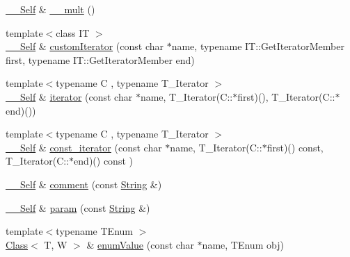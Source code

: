 \begin{DoxyCompactItemize}
\item 
\hyperlink{classSLB_1_1Class_aef6fc94f5e50c96268e669ab6946ad8b}{\+\_\+\+\_\+\+Self} \& \hyperlink{classSLB_1_1Class_a44ac413ee19c8266018ed7bf7909b68b}{\+\_\+\+\_\+mult} ()
\item 
{\footnotesize template$<$class IT $>$ }\\\hyperlink{classSLB_1_1Class_aef6fc94f5e50c96268e669ab6946ad8b}{\+\_\+\+\_\+\+Self} \& \hyperlink{classSLB_1_1Class_ab05f52bee9d746009e35de1e86103c0d}{custom\+Iterator} (const char $\ast$name, typename I\+T\+::\+Get\+Iterator\+Member first, typename I\+T\+::\+Get\+Iterator\+Member end)
\item 
{\footnotesize template$<$typename C , typename T\+\_\+\+Iterator $>$ }\\\hyperlink{classSLB_1_1Class_aef6fc94f5e50c96268e669ab6946ad8b}{\+\_\+\+\_\+\+Self} \& \hyperlink{classSLB_1_1Class_a565d027072f2df91a30b965a43d27ed0}{iterator} (const char $\ast$name, T\+\_\+\+Iterator(C\+::$\ast$first)(), T\+\_\+\+Iterator(C\+::$\ast$end)())
\item 
{\footnotesize template$<$typename C , typename T\+\_\+\+Iterator $>$ }\\\hyperlink{classSLB_1_1Class_aef6fc94f5e50c96268e669ab6946ad8b}{\+\_\+\+\_\+\+Self} \& \hyperlink{classSLB_1_1Class_aa9677ffc2710abb570c70af8929fa027}{const\+\_\+iterator} (const char $\ast$name, T\+\_\+\+Iterator(C\+::$\ast$first)() const, T\+\_\+\+Iterator(C\+::$\ast$end)() const )
\item 
\hyperlink{classSLB_1_1Class_aef6fc94f5e50c96268e669ab6946ad8b}{\+\_\+\+\_\+\+Self} \& \hyperlink{classSLB_1_1Class_a60cedfead3b3fa8af93ee2f607692d9d}{comment} (const \hyperlink{namespaceSLB_a6a4c36e7004d99c0535c2c91c200c9a1}{String} \&)
\item 
\hyperlink{classSLB_1_1Class_aef6fc94f5e50c96268e669ab6946ad8b}{\+\_\+\+\_\+\+Self} \& \hyperlink{classSLB_1_1Class_afbbf575f9569e266000c5cd734cba7f0}{param} (const \hyperlink{namespaceSLB_a6a4c36e7004d99c0535c2c91c200c9a1}{String} \&)
\item 
{\footnotesize template$<$typename T\+Enum $>$ }\\\hyperlink{classSLB_1_1Class}{Class}$<$ T, W $>$ \& \hyperlink{classSLB_1_1Class_ae158d149b620419df5eb0974e86c10d8}{enum\+Value} (const char $\ast$name, T\+Enum obj)
\end{DoxyCompactItemize}
